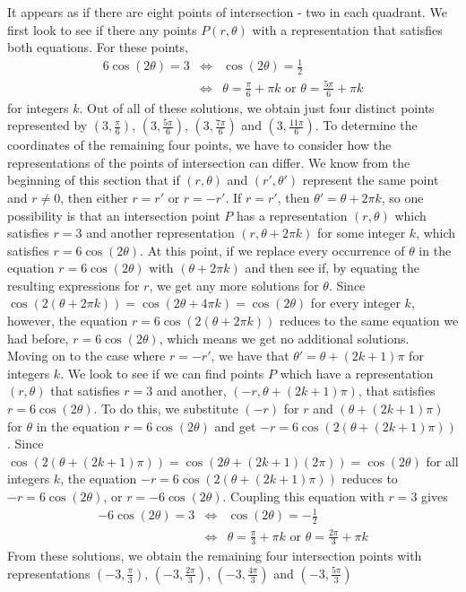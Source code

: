 \begin{example}
\begin{enumerate}
It appears as if there are eight points of intersection - two in each quadrant. We first look to see if there any points $P(r,\theta)$ with a representation that satisfies both equations.  For these points,  
\begin{eqnarray*}
6\cos(2\theta) = 3&\Leftrightarrow&\cos(2\theta) = \frac{1}{2}\\
&\Leftrightarrow&\theta = \frac{\pi}{6} + \pi k \text{ or } \theta = \frac{5\pi}{6} + \pi k
\end{eqnarray*}
for integers $k$.  Out of all of these solutions, we obtain just four distinct points represented by  $\left(3, \frac{\pi}{6}\right)$, $\left(3, \frac{5\pi}{6} \right)$, $\left(3, \frac{7\pi}{6}\right)$ and $\left(3, \frac{11\pi}{6} \right)$.  To determine the coordinates of the remaining four points, we have to consider how the representations of the points of intersection can differ.  We know from the beginning of this section that if $(r,\theta)$ and $(r', \theta')$ represent the same point and $r \neq 0$, then either $r = r'$ or $r = -r'$.  If $r = r'$, then $\theta' = \theta + 2\pi k$, so one possibility is that an intersection point $P$ has a representation $(r,\theta)$ which satisfies $r=3$  and another representation $(r, \theta + 2\pi k)$ for some integer $k$, which satisfies $r = 6\cos(2\theta)$.  At this point, if we replace every occurrence of $\theta$ in the equation $r=6\cos(2\theta)$ with $(\theta + 2\pi k)$ and then see if, by equating the resulting expressions for $r$, we get any more solutions for $\theta$. Since $\cos(2(\theta + 2\pi k)) = \cos(2\theta + 4\pi k) = \cos(2\theta)$ for every integer $k$, however, the equation $r = 6\cos(2(\theta + 2\pi k))$ reduces to the same equation we had before, $r = 6\cos(2\theta)$,  which means we get no additional solutions.\\     Moving on to the case where $r = -r'$, we have that $\theta' = \theta + (2k+1)\pi$ for integers $k$.  We look to see if we can find points $P$ which have a representation $(r,\theta)$ that satisfies $r=3$  and another, $(-r, \theta + (2k+1)\pi)$, that satisfies  $r = 6\cos(2\theta)$.  To do this, we substitute   $(-r)$ for $r$ and  $(\theta + (2k+1)\pi)$ for $\theta$ in the equation $r = 6\cos(2\theta)$ and get $-r = 6\cos(2(\theta + (2k+1)\pi))$.  Since $\cos(2(\theta + (2k+1)\pi)) = \cos(2\theta + (2k+1)(2\pi)) = \cos(2\theta)$ for all integers $k$, the equation $-r = 6\cos(2(\theta + (2k+1)\pi))$ reduces to $-r = 6\cos(2\theta)$, or $r = -6\cos(2\theta)$.   Coupling this equation with  $r=3$ gives
\begin{eqnarray*}
-6\cos(2\theta) = 3&\Leftrightarrow&\cos(2\theta) = -\frac{1}{2}\\
&\Leftrightarrow&\theta = \frac{\pi}{3} + \pi k\text{ or }\theta = \frac{2\pi}{3} + \pi k
\end{eqnarray*}
From these solutions, we obtain the remaining four intersection points with representations $\left(-3, \frac{\pi}{3}\right)$,  $\left(-3, \frac{2\pi}{3}\right)$,  $\left(-3, \frac{4\pi}{3}\right)$ and  $\left(-3, \frac{5\pi}{3}\right)$
\end{enumerate}






\end{example}
